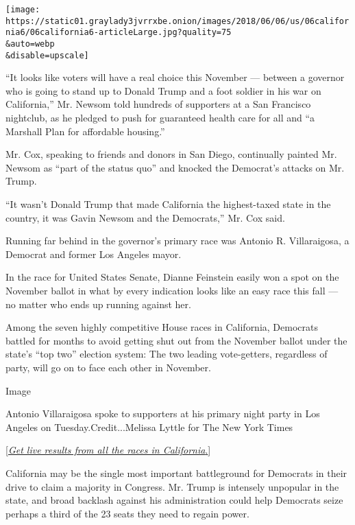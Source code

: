 \texttt{[image: https://static01.graylady3jvrrxbe.onion/images/2018/06/06/us/06california6/06california6-articleLarge.jpg?quality=75\\\&auto=webp\\\&disable=upscale]}

``It looks like voters will have a real choice this November --- between
a governor who is going to stand up to Donald Trump and a foot soldier
in his war on California,'' Mr. Newsom told hundreds of supporters at a
San Francisco nightclub, as he pledged to push for guaranteed health
care for all and ``a Marshall Plan for affordable housing.''

Mr. Cox, speaking to friends and donors in San Diego, continually
painted Mr. Newsom as ``part of the status quo'' and knocked the
Democrat's attacks on Mr. Trump.

``It wasn't Donald Trump that made California the highest-taxed state in
the country, it was Gavin Newsom and the Democrats,'' Mr. Cox said.

Running far behind in the governor's primary race was Antonio R.
Villaraigosa, a Democrat and former Los Angeles mayor.

In the race for United States Senate, Dianne Feinstein easily won a spot
on the November ballot in what by every indication looks like an easy
race this fall --- no matter who ends up running against her.

Among the seven highly competitive House races in California, Democrats
battled for months to avoid getting shut out from the November ballot
under the state's ``top two'' election system: The two leading
vote-getters, regardless of party, will go on to face each other in
November.

Image

Antonio Villaraigosa spoke to supporters at his primary night party in
Los Angeles on Tuesday.Credit...Melissa Lyttle for The New York Times

{[}\emph{\href{https://www.nytimes3xbfgragh.onion/interactive/2018/06/05/us/elections/results-california-primary-elections.html?action=click\&module=Intentional\&pgtype=Article}{Get
live results from all the races in
California}}\href{https://www.nytimes3xbfgragh.onion/interactive/2018/06/05/us/elections/results-california-primary-elections.html?action=click\&module=Intentional\&pgtype=Article}{.}{]}

California may be the single most important battleground for Democrats
in their drive to claim a majority in Congress. Mr. Trump is intensely
unpopular in the state, and broad backlash against his administration
could help Democrats seize perhaps a third of the 23 seats they need to
regain power.

